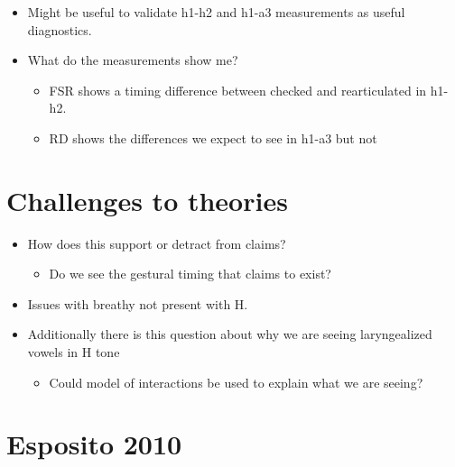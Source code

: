 \documentclass[12pt, letterpaper]{article}
\begin{document}
\begin{itemize}
	\item Might be useful to validate h1-h2 and h1-a3 measurements as useful diagnostics. 
	\item What do the measurements show me?
	\begin{itemize}
		\item FSR shows a timing difference between checked and rearticulated in h1-h2.
		\item RD shows the differences we expect to see in h1-a3 but not 
	\end{itemize}
\end{itemize}

\section{Challenges to theories} \label{sec:Challenges}

\begin{itemize}
	\item How does this support or detract from  claims?
	\begin{itemize}
		\item Do we see the gestural timing that \citet{silvermanLaryngealComplexityOtomanguean1997} claims to exist?
	\end{itemize}
	\item Issues with breathy not present with H. 
	\item Additionally there is this question about why we are seeing laryngealized vowels in H tone
	\begin{itemize}
		\item Could  model of interactions be used to explain what we are seeing?
	\end{itemize}
\end{itemize}




\section{Esposito 2010} \label{sec:Esposito}
\end{document}
